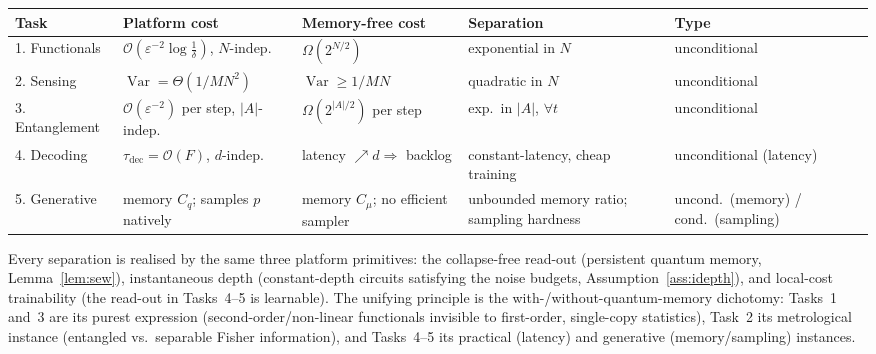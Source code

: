 \documentclass[11pt]{article}
\theoremstyle{plain}
\theoremstyle{definition}
\theoremstyle{remark}
\newcommand{\Var}{\operatorname{Var}}
\newcommand{\eps}{\varepsilon}
\newcommand{\bigO}{\mathcal{O}}
\begin{document}
\begin{center}
\renewcommand{\arraystretch}{1.35}
\begin{tabular}{@{}p{2.3cm}p{2.5cm}p{2.9cm}p{3.0cm}p{2.4cm}@{}}
\hline
\textbf{Task} & \textbf{Platform cost} & \textbf{Memory-free cost} & \textbf{Separation} & \textbf{Type}\\
\hline
1. Functionals & $\bigO(\eps^{-2}\log\tfrac1\delta)$, $N$-indep. & $\Omega(2^{N/2})$ & exponential in $N$ & unconditional\\
2. Sensing & $\Var=\Theta(1/MN^2)$ & $\Var\ge 1/MN$ & quadratic in $N$ & unconditional\\
3. Entanglement & $\bigO(\eps^{-2})$ per step, $|A|$-indep. & $\Omega(2^{|A|/2})$ per step & exp.\ in $|A|$, $\forall t$ & unconditional\\
4. Decoding & $\tau_{\mathrm{dec}}=\bigO(F)$, $d$-indep. & latency $\nearrow d\Rightarrow$ backlog & constant-latency, cheap training & unconditional (latency)\\
5. Generative & memory $C_q$; samples $p$ natively & memory $C_\mu$; no efficient sampler & unbounded memory ratio; sampling hardness & uncond.\ (memory) / cond.\ (sampling)\\
\hline
\end{tabular}
\end{center}

Every separation is realised by the same three platform primitives: the collapse-free read-out (persistent quantum memory, Lemma~\ref{lem:sew}), instantaneous depth (constant-depth circuits satisfying the noise budgets, Assumption~\ref{ass:idepth}), and local-cost trainability (the read-out in Tasks~4--5 is learnable). The unifying principle is the with-/without-quantum-memory dichotomy: Tasks~1 and~3 are its purest expression (second-order/non-linear functionals invisible to first-order, single-copy statistics), Task~2 its metrological instance (entangled vs.\ separable Fisher information), and Tasks~4--5 its practical (latency) and generative (memory/sampling) instances.
\end{document}
